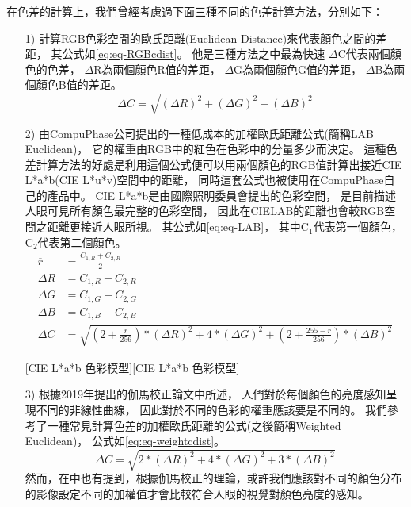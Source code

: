 \documentclass[class=NCU_thesis, crop=false]{standalone}
\begin{document}
			在色差的計算上，我們曾經考慮過下面三種不同的色差計算方法，分別如下：
			\begin{itemize}
			  \item [1)] 
			  	計算RGB色彩空間的歐氏距離(Euclidean Distance)來代表顏色之間的差距，
			  	其公式如\cref{eq:eq-RGBcdist}。
			  	他是三種方法之中最為快速
			  	$\Delta$C代表兩個顏色的色差，
			  	$\Delta$R為兩個顏色R值的差距，
			  	$\Delta$G為兩個顏色G值的差距，
			  	$\Delta$B為兩個顏色B值的差距。
			  	\begin{equation}
			    \label{eq:eq-RGBcdist}
			    	\Delta C = \sqrt{(\Delta R)^2 + (\Delta G)^2 + (\Delta B)^2}
				\end{equation}

			  \item [2)]
			  	由CompuPhase公司提出的一種低成本的加權歐氏距離公式\cite{LABformula}(簡稱LAB Euclidean)，
			  	它的權重由RGB中的紅色在色彩中的分量多少而決定。
			  	這種色差計算方法的好處是利用這個公式便可以用兩個顏色的RGB值計算出接近CIE L*a*b(CIE L*u*v)空間中的距離，
			  	同時這套公式也被使用在CompuPhase自己的產品中。
			  	CIE L*a*b是由國際照明委員會提出的色彩空間，
			  	是目前描述人眼可見所有顏色最完整的色彩空間，
			  	因此在CIELAB的距離也會較RGB空間之距離更接近人眼所視。
			  	其公式如\cref{eq:eq-LAB}，
			  	其中C$_{1}$代表第一個顏色，
			  	C$_{2}$代表第二個顏色。
			  	\begin{equation}
			    \label{eq:eq-LAB}
			    \begin{split}
			    	\overline{r} & = \frac{C_{1,R} + C_{2,R}}{2} \\
			    	\Delta R & = C_{1,R} - C_{2,R} \\
			    	\Delta G & = C_{1,G} - C_{2,G} \\
			    	\Delta B & = C_{1,B} - C_{2,B} \\
			    	\Delta C & = \sqrt{(2 + \frac{\overline{r}}{256}) * (\Delta R)^2 + 4 * (\Delta G)^2 + (2 + \frac{255 - \overline{r}}{256}) * (\Delta B)^2}
			    \end{split}
				\end{equation}

				[CIE L*a*b 色彩模型][CIE L*a*b 色彩模型]
				

			  \item [3)]
			  	根據2019年提出的伽馬校正論文\cite{GammaCorrection}中所述，
			  	人們對於每個顏色的亮度感知呈現不同的非線性曲線，
			  	因此對於不同的色彩的權重應該要是不同的。
			  	我們參考了一種常見計算色差的加權歐氏距離的公式(之後簡稱Weighted Euclidean)，
			  	公式如\cref{eq:eq-weightcdist}。
			  	\begin{equation}
			    \label{eq:eq-weightcdist}
			    	\Delta C = \sqrt{2 * (\Delta R)^2 + 4 * (\Delta G)^2 + 3 * (\Delta B)^2}
				\end{equation}
				然而，在\cite{LABformula}中也有提到，根據伽馬校正的理論，或許我們應該對不同的顏色分布的影像設定不同的加權值才會比較符合人眼的視覺對顏色亮度的感知。
			\end{itemize}
\end{document}
